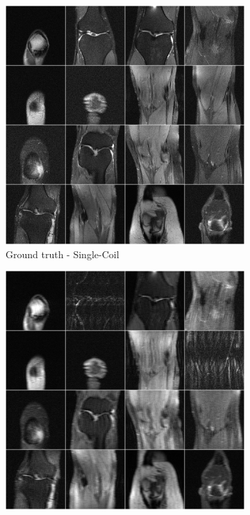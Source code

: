 \documentclass{article}
\begin{document}
    \newpage
\begin{figure}[H] 
\centering
   \begin{subfigure}[]{.5\textwidth}
   \centering
        \includegraphics[width=.95\linewidth]{target}
	\caption{Ground truth  - Single-Coil }
	\vspace*{2mm} 
    \end{subfigure}%
   \begin{subfigure}[]{.5\textwidth}
   \centering
        \includegraphics[width=.95\linewidth]{undersampled}

\end{subfigure}
\end{figure}
\end{document}
